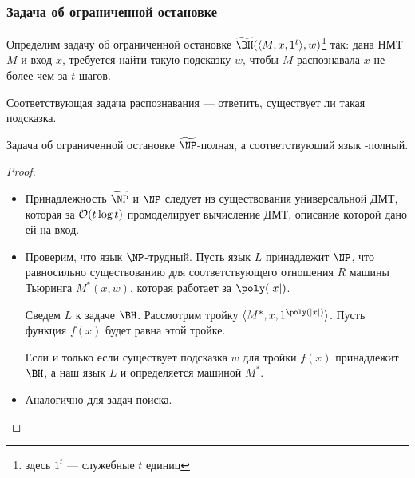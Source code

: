 \subsubsection{Задача об ограниченной остановке}
\begin{defn}[\BH]
	Определим задачу об ограниченной остановке $ \tBH(\langle M, x, 1^{t} \rangle, w)$\footnote{здесь $ 1^{t}$ --- служебные $ t$ единиц} так:
	дана НМТ $ M$ и вход $ x$, требуется найти такую подсказку $ w$, чтобы $ M$ распознавала $ x$ не более чем за $ t$ шагов.

	\noindent
	Соответствующая задача распознавания --- ответить, существует ли такая подсказка.
\end{defn}
\begin{thm}
    Задача об ограниченной остановке $ \tNP$-полная, а соответствующий язык \NP-полный.
\end{thm}
\begin{proof}
	\begin{itemize}
		\item Принадлежность $ \tNP$ и $ \NP$ следует из существования универсальной ДМТ, которая за $ \mathcal{O}(t \log t)$ промоделирует вычисление ДМТ, описание которой дано ей на вход.
		\item Проверим, что язык  $ \NP$-трудный.
			Пусть  язык $ L$ принадлежит $ \NP$, что равносильно существованию для соответствующего отношения $ R$ машины Тьюринга $ M^{*}(x, w)$, которая работает за $ \poly(\lvert x \rvert )$.

			Сведем $ L$ к задаче $ \BH$. Рассмотрим тройку $ \langle M^{*}, x, 1^{\poly(\lvert x \rvert )} \rangle$. 
			Пусть функция $ f(x)$ будет равна этой тройке.

			Если и только если существует подсказка $ w$ для тройки $ f(x) $ принадлежит $ \BH$, а наш язык $ L$ и определяется машиной $ M^{*}$. 
		\item Аналогично для задач поиска.
    \end{itemize}
\end{proof}

